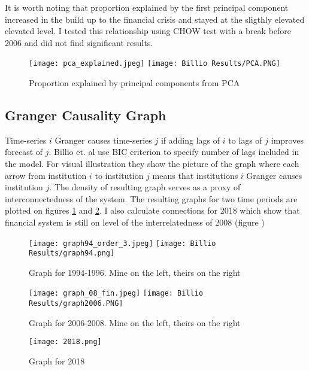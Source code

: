 \documentclass[preprint,pre,floats,aps,amsmath,amssymb]{revtex4}
\begin{document}
It is worth noting that proportion explained by the first principal component increased in the build up to the financial crisis and stayed at the sligthly elevated elevated level. I tested this relationship using CHOW test with a break before 2006 and did not find significant results.

\begin{figure}[ht]
\texttt{[image: pca\_explained.jpeg]}
\texttt{[image: Billio Results/PCA.PNG]}

\caption{Proportion explained by principal components from PCA }

\end{figure}



\subsection{Granger Causality Graph}

Time-series $i$ Granger causes time-series $j$ if adding lags of $i$ to lags of $j$ improves forecast of $j$. Billio et. al use BIC criterion to specify number of lags included in the model. For visual illustration they show the picture of the graph where each arrow from institution $i$ to institution $j$ means that institutions $i$ Granger causes institution $j$.   The density of resulting graph serves as a proxy of interconnectedness of the system. The resulting graphs for two time periods are plotted on figures  \ref{fig:granger1} and \ref{fig:granger2}. I also calculate connections for 2018 which show that financial system is still on level of the interrelatedness of 2008 (figure  \cite{fig:granger3})

\begin{figure}[ht]
\texttt{[image: graph94\_order\_3.jpeg]}
\texttt{[image: Billio Results/graph94.png]}

\caption{Graph for 1994-1996. Mine on the left, theirs on the right }
\label{fig:granger1}
\end{figure}

\begin{figure}[ht]
\texttt{[image: graph\_08\_fin.jpeg]}
\texttt{[image: Billio Results/graph2006.PNG]}

\caption{Graph for 2006-2008. Mine on the left, theirs on the right }
\label{fig:granger2}
\end{figure}

\begin{figure}[ht]
\texttt{[image: 2018.png]}

\caption{Graph for 2018 }
\label{fig:granger3}
\end{figure}
\end{document}
